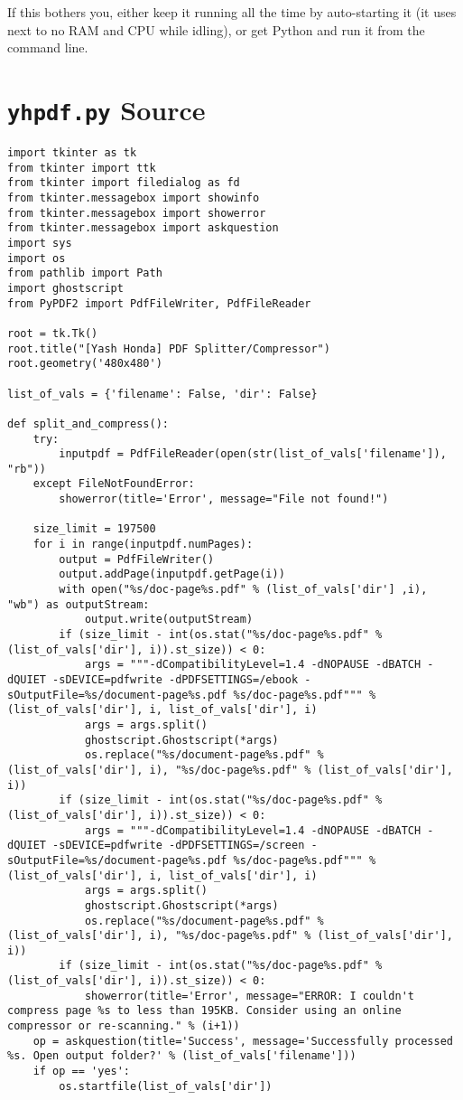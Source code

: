 \documentclass[9pt]{report}
\begin{document}
If this bothers you, either keep it running all the time by
auto-starting it (it uses next to no RAM and CPU while idling), or
get Python and run it from the command line.

\chapter{\texttt{yhpdf.py} Source}
\label{sec:org513c897}

\begin{verbatim}
import tkinter as tk
from tkinter import ttk
from tkinter import filedialog as fd
from tkinter.messagebox import showinfo
from tkinter.messagebox import showerror
from tkinter.messagebox import askquestion
import sys
import os
from pathlib import Path
import ghostscript
from PyPDF2 import PdfFileWriter, PdfFileReader

root = tk.Tk()
root.title("[Yash Honda] PDF Splitter/Compressor")
root.geometry('480x480')

list_of_vals = {'filename': False, 'dir': False}

def split_and_compress():
    try:
        inputpdf = PdfFileReader(open(str(list_of_vals['filename']), "rb"))
    except FileNotFoundError:
        showerror(title='Error', message="File not found!")

    size_limit = 197500
    for i in range(inputpdf.numPages):
        output = PdfFileWriter()
        output.addPage(inputpdf.getPage(i))
        with open("%s/doc-page%s.pdf" % (list_of_vals['dir'] ,i), "wb") as outputStream:
            output.write(outputStream)
        if (size_limit - int(os.stat("%s/doc-page%s.pdf" % (list_of_vals['dir'], i)).st_size)) < 0:
            args = """-dCompatibilityLevel=1.4 -dNOPAUSE -dBATCH -dQUIET -sDEVICE=pdfwrite -dPDFSETTINGS=/ebook -sOutputFile=%s/document-page%s.pdf %s/doc-page%s.pdf""" % (list_of_vals['dir'], i, list_of_vals['dir'], i)
            args = args.split()
            ghostscript.Ghostscript(*args)
            os.replace("%s/document-page%s.pdf" % (list_of_vals['dir'], i), "%s/doc-page%s.pdf" % (list_of_vals['dir'], i))
        if (size_limit - int(os.stat("%s/doc-page%s.pdf" % (list_of_vals['dir'], i)).st_size)) < 0:
            args = """-dCompatibilityLevel=1.4 -dNOPAUSE -dBATCH -dQUIET -sDEVICE=pdfwrite -dPDFSETTINGS=/screen -sOutputFile=%s/document-page%s.pdf %s/doc-page%s.pdf""" % (list_of_vals['dir'], i, list_of_vals['dir'], i)
            args = args.split()
            ghostscript.Ghostscript(*args)
            os.replace("%s/document-page%s.pdf" % (list_of_vals['dir'], i), "%s/doc-page%s.pdf" % (list_of_vals['dir'], i))
        if (size_limit - int(os.stat("%s/doc-page%s.pdf" % (list_of_vals['dir'], i)).st_size)) < 0:
            showerror(title='Error', message="ERROR: I couldn't compress page %s to less than 195KB. Consider using an online compressor or re-scanning." % (i+1))
    op = askquestion(title='Success', message='Successfully processed %s. Open output folder?' % (list_of_vals['filename']))
    if op == 'yes':
        os.startfile(list_of_vals['dir'])


\end{verbatim}
\end{document}
